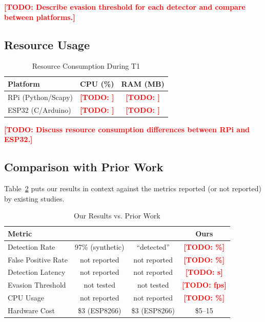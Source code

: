 \documentclass[conference]{IEEEtran}
\newcommand{\placeholder}[1]{\textcolor{red}{\textbf{[TODO: #1]}}}
\begin{document}
\placeholder{Describe evasion threshold for each detector and compare between platforms.}

\subsection{Resource Usage}

\begin{table}[htbp]
\caption{Resource Consumption During T1}
\label{tab:resources}
\centering
\small
\begin{tabular}{@{}lcc@{}}
\toprule
\textbf{Platform} & \textbf{CPU (\%)} & \textbf{RAM (MB)} \\
\midrule
RPi (Python/Scapy) & \placeholder{} & \placeholder{} \\
ESP32 (C/Arduino) & \placeholder{} & \placeholder{} \\
\bottomrule
\end{tabular}
\end{table}

\placeholder{Discuss resource consumption differences between RPi and ESP32.}

\subsection{Comparison with Prior Work}

Table~\ref{tab:comparison_prior} puts our results in context against the metrics reported (or not reported) by existing studies.

\begin{table}[htbp]
\caption{Our Results vs. Prior Work}
\label{tab:comparison_prior}
\centering
\small
\begin{tabular}{@{}lccc@{}}
\toprule
\textbf{Metric} & \cite{nature2025_deauth} & \cite{ijert2024_deauth} & \textbf{Ours} \\
\midrule
Detection Rate & 97\% (synthetic) & ``detected'' & \placeholder{\%} \\
False Positive Rate & not reported & not reported & \placeholder{\%} \\
Detection Latency & not reported & not reported & \placeholder{s} \\
Evasion Threshold & not tested & not tested & \placeholder{fps} \\
CPU Usage & not reported & not reported & \placeholder{\%} \\
Hardware Cost & \$3 (ESP8266) & \$3 (ESP8266) & \$5--15 \\
\bottomrule
\end{tabular}
\end{table}
\end{document}
